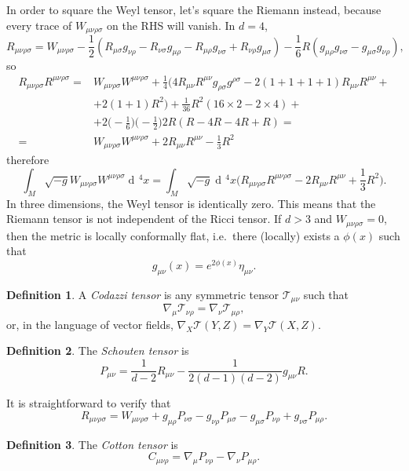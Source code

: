 \documentclass[a4paper,12pt]{book}
\newcommand{\dd}{\mathop{\mathrm{d}\!}{}}
\theoremstyle{definition}
\newtheorem{definition}{Definition}
\theoremstyle{remark}
\begin{document}
In order to square the Weyl tensor, let's square the Riemann instead, because every trace of $W_{\mu\nu\rho\sigma}$ on the RHS will vanish. In $d=4$,
\[R_{\mu\nu\rho\sigma}=W_{\mu\nu\rho\sigma}-\frac12(R_{\mu\sigma}g_{\nu\rho}-R_{\nu\sigma}g_{\mu\rho}-R_{\mu\rho}g_{\nu\sigma}+R_{\nu\rho}g_{\mu\sigma})-\frac16R(g_{\mu\rho}g_{\nu\sigma}-g_{\mu\sigma}g_{\nu\rho}),\]
so
\begin{align*}
R_{\mu\nu\rho\sigma}R^{\mu\nu\rho\sigma}={}&W_{\mu\nu\rho\sigma}W^{\mu\nu\rho\sigma}+\frac14\bigl(4R_{\mu\nu}R^{\mu\nu}g_{\rho\sigma}g^{\rho\sigma}-2(1+1+1+1)R_{\mu\nu}R^{\mu\nu}+{}\\
&+2(1+1)R^2\bigr)+\frac1{36}R^2(16\times 2-2\times 4)+{}\\
&+2\biggl(-\frac16\biggr)\biggl(-\frac12\biggr)2R(R-4R-4R+R)=\\
={}&W_{\mu\nu\rho\sigma}W^{\mu\nu\rho\sigma}+2R_{\mu\nu}R^{\mu\nu}-\frac13R^2
\end{align*}
therefore
\[\int_M\sqrt{-g}W_{\mu\nu\rho\sigma}W^{\mu\nu\rho\sigma}\dd^4x=\int_M\sqrt{-g}\dd^4x\biggl(R_{\mu\nu\rho\sigma}R^{\mu\nu\rho\sigma}-2R_{\mu\nu}R^{\mu\nu}+\frac13R^2\biggr).\]
In three dimensions, the Weyl tensor is identically zero. This means that the Riemann tensor is not independent of the Ricci tensor. If $d>3$ and $W_{\mu\nu\rho\sigma}=0$, then the metric is locally conformally flat, i.e.~there (locally) exists a $\phi(x)$ such that
\[g_{\mu\nu}(x)=e^{2\phi(x)}\eta_{\mu\nu}.\]

\begin{definition}
A \emph{Codazzi tensor} is any symmetric tensor $\mathcal T_{\mu\nu}$ such that
\[\nabla_\mu\mathcal T_{\nu\rho}=\nabla_\nu\mathcal T_{\mu\rho},\]
or, in the language of vector fields, $\nabla_X\mathcal T(Y,Z)=\nabla_Y\mathcal T(X,Z)$.
\end{definition}

\begin{definition}
The \emph{Schouten tensor} is
\[P_{\mu\nu}=\frac1{d-2}R_{\mu\nu}-\frac1{2(d-1)(d-2)}g_{\mu\nu}R.\]
\end{definition}

It is straightforward to verify that
\[R_{\mu\nu\rho\sigma}=W_{\mu\nu\rho\sigma}+g_{\mu\rho}P_{\nu\sigma}-g_{\nu\rho}P_{\mu\sigma}-g_{\mu\sigma}P_{\nu\rho}+g_{\nu\sigma}P_{\mu\rho}.\]

\begin{definition}
The \emph{Cotton tensor} is
\[C_{\mu\nu\rho}=\nabla_\mu P_{\nu\rho}-\nabla_\nu P_{\mu\rho}.\]
\end{definition}
\end{document}
